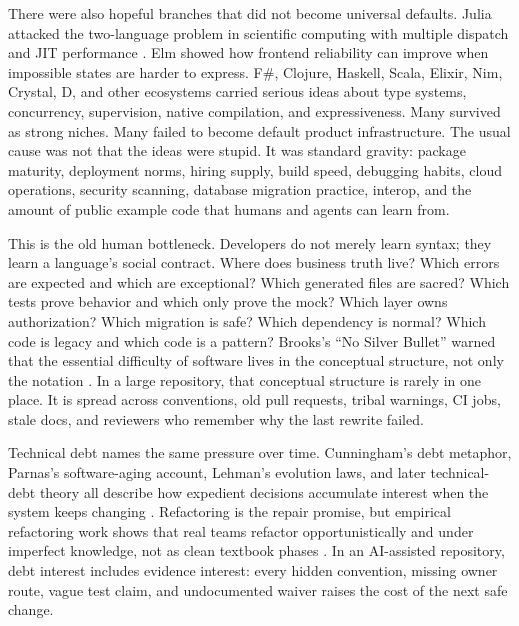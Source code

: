 There were also hopeful branches that did not become universal defaults. Julia attacked the two-language problem in scientific computing with multiple dispatch and JIT performance \cite{bezansonJulia2017}. Elm showed how frontend reliability can improve when impossible states are harder to express. F\#, Clojure, Haskell, Scala, Elixir, Nim, Crystal, D, and other ecosystems carried serious ideas about type systems, concurrency, supervision, native compilation, and expressiveness. Many survived as strong niches. Many failed to become default product infrastructure. The usual cause was not that the ideas were stupid. It was standard gravity: package maturity, deployment norms, hiring supply, build speed, debugging habits, cloud operations, security scanning, database migration practice, interop, and the amount of public example code that humans and agents can learn from.

This is the old human bottleneck. Developers do not merely learn syntax; they learn a language's social contract. Where does business truth live? Which errors are expected and which are exceptional? Which generated files are sacred? Which tests prove behavior and which only prove the mock? Which layer owns authorization? Which migration is safe? Which dependency is normal? Which code is legacy and which code is a pattern? Brooks's ``No Silver Bullet'' warned that the essential difficulty of software lives in the conceptual structure, not only the notation \cite{brooksNoSilverBullet1987}. In a large repository, that conceptual structure is rarely in one place. It is spread across conventions, old pull requests, tribal warnings, CI jobs, stale docs, and reviewers who remember why the last rewrite failed.

Technical debt names the same pressure over time. Cunningham's debt metaphor, Parnas's software-aging account, Lehman's evolution laws, and later technical-debt theory all describe how expedient decisions accumulate interest when the system keeps changing \cite{cunninghamTechnicalDebt1992,parnasSoftwareAging1994,lehmanEvolutionLaws1980,kruchtenTechnicalDebt2012,liTechnicalDebtMapping2015}. Refactoring is the repair promise, but empirical refactoring work shows that real teams refactor opportunistically and under imperfect knowledge, not as clean textbook phases \cite{brownManagingTechnicalDebt2010,murphyHillRefactoring2012}. In an AI-assisted repository, debt interest includes evidence interest: every hidden convention, missing owner route, vague test claim, and undocumented waiver raises the cost of the next safe change.

